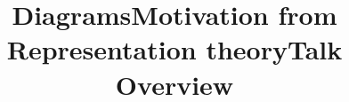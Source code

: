 \title{Diagrams}\maketitle

\title{Motivation from Representation theory}\maketitle

\title{Talk Overview}\maketitle


